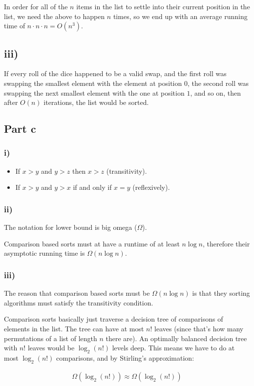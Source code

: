 \documentclass{article}
\begin{document}
In order for all of the $n$ items in the list to settle into their current
position in the list, we need the above to happen $n$ times, so we end up with
an average running time of $n \cdot n \cdot n = O(n^3)$.

\subsection{iii)}

If every roll of the dice happened to be a valid swap, and the first roll was
swapping the smallest element with the element at position $0$, the second roll
was swapping the next smallest element with the one at position $1$, and so on,
then after $O(n)$ iterations, the list would be sorted.

\subsection{Part c}

\subsubsection{i)}

\begin{itemize}
  \item If $x > y$ and $y > z$ then $x > z$ (transitivity).
  \item If $x > y$ and $y > x$ if and only if $x = y$ (reflexively).
\end{itemize}

\subsubsection{ii)}

The notation for lower bound is big omega ($\Omega$).

Comparison based sorts must at have a runtime of at least $n \log n$, therefore
their asymptotic running time is $\Omega(n \log n)$.

\subsubsection{iii)}

The reason that comparison based sorts must be $\Omega(n \log n)$ is that they
sorting algorithms must satisfy the transitivity condition.

Comparison sorts basically just traverse a decision tree of comparisons of
elements in the list. The tree can have at most $n!$ leaves (since that's how
many permutations of a list of length $n$ there are). An optimally balanced
decision tree with $n!$ leaves would be $\log_2(n!)$ levels deep. This means we
have to do at most $\log_2(n!)$ comparisons, and by Stirling's approximation:

\begin{align*}
  \Omega(\log_2(n!)) \approx \Omega(\log_2(n!))
\end{align*}
\end{document}
